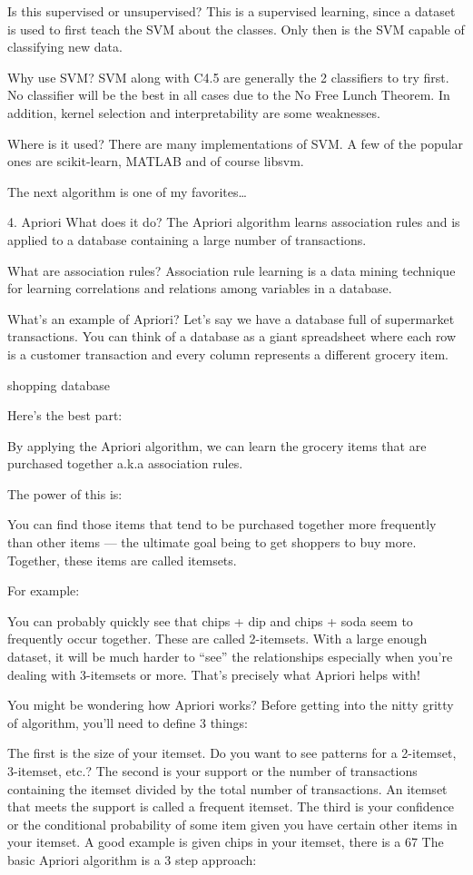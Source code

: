 Is this supervised or unsupervised? This is a supervised learning, since a dataset is used to first teach the SVM about the classes. Only then is the SVM capable of classifying new data.

Why use SVM? SVM along with C4.5 are generally the 2 classifiers to try first. No classifier will be the best in all cases due to the No Free Lunch Theorem. In addition, kernel selection and interpretability are some weaknesses.

Where is it used? There are many implementations of SVM. A few of the popular ones are scikit-learn, MATLAB and of course libsvm.

The next algorithm is one of my favorites…

4. Apriori
What does it do? The Apriori algorithm learns association rules and is applied to a database containing a large number of transactions.

What are association rules? Association rule learning is a data mining technique for learning correlations and relations among variables in a database.

What’s an example of Apriori? Let’s say we have a database full of supermarket transactions. You can think of a database as a giant spreadsheet where each row is a customer transaction and every column represents a different grocery item.

shopping database

Here’s the best part:

By applying the Apriori algorithm, we can learn the grocery items that are purchased together a.k.a association rules.

The power of this is:

You can find those items that tend to be purchased together more frequently than other items — the ultimate goal being to get shoppers to buy more. Together, these items are called itemsets.

For example:

You can probably quickly see that chips + dip and chips + soda seem to frequently occur together. These are called 2-itemsets. With a large enough dataset, it will be much harder to “see” the relationships especially when you’re dealing with 3-itemsets or more. That’s precisely what Apriori helps with!

You might be wondering how Apriori works? Before getting into the nitty gritty of algorithm, you’ll need to define 3 things:

The first is the size of your itemset. Do you want to see patterns for a 2-itemset, 3-itemset, etc.?
The second is your support or the number of transactions containing the itemset divided by the total number of transactions. An itemset that meets the support is called a frequent itemset.
The third is your confidence or the conditional probability of some item given you have certain other items in your itemset. A good example is given chips in your itemset, there is a 67%
The basic Apriori algorithm is a 3 step approach:

